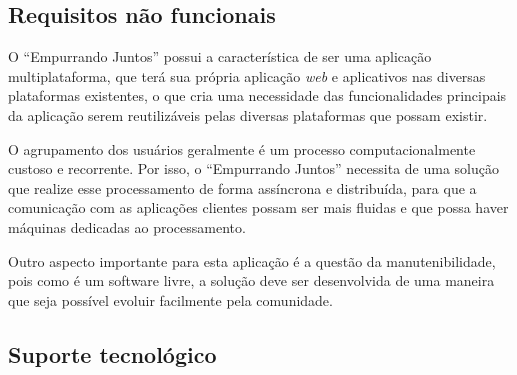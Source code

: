	  
      
    \subsection*{Requisitos não funcionais}	\label{non_functional_requirements}
    
    O ``Empurrando Juntos'' possui a característica de ser uma aplicação multiplataforma,
    que terá sua própria aplicação \textit{web} e aplicativos nas diversas plataformas existentes,
    o que cria uma necessidade das funcionalidades principais da aplicação serem reutilizáveis
    pelas diversas plataformas que possam existir.
    
    O agrupamento dos usuários geralmente é um processo computacionalmente custoso e recorrente. Por isso, o ``Empurrando Juntos''
    necessita de uma solução que realize esse processamento de forma assíncrona e distribuída, para que a comunicação com
    as aplicações clientes possam ser mais fluidas e que possa haver máquinas dedicadas ao processamento.
    
    Outro aspecto importante para esta aplicação é a questão da manutenibilidade, pois como é um software livre, a solução
    deve ser desenvolvida de uma maneira que seja possível evoluir facilmente pela comunidade.
    
    \subsection*{Suporte tecnológico}
    
